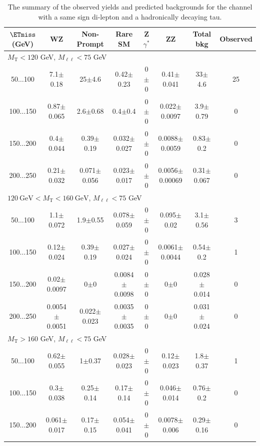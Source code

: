 \begin{landscape}
\begin{table}
\end{table}
\begin{table}
\small
\begin{center}
\caption{\label{tab:SStau1} The summary of the observed yields and predicted backgrounds for the channel with a same sign di-lepton and a hadronically decaying tau. }
\begin{tabular}{| c | c c c c c c c | }\hline\hline
$\ETmiss$ (GeV) & WZ & Non-Prompt & Rare SM & Z$\gamma^*$ & ZZ & Total bkg & Observed\\\hline\hline
\multicolumn{7}{l}{$M_{\text{T}} < 120$ GeV, $M_{\ell\ell} < 75$ GeV}\\\hline\hline
50$\dots$100&7.1$\pm$0.18&25$\pm$4.6&0.42$\pm$0.23&0$\pm$0&0.41$\pm$0.041&33$\pm$4.6&25\\
100$\dots$150&0.87$\pm$0.065&2.6$\pm$0.68&0.4$\pm$0.4&0$\pm$0&0.022$\pm$0.0097&3.9$\pm$0.79&0\\
150$\dots$200&0.4$\pm$0.044&0.39$\pm$0.19&0.032$\pm$0.027&0$\pm$0&0.0088$\pm$0.0059&0.83$\pm$0.2&0\\
200$\dots$250&0.21$\pm$0.032&0.071$\pm$0.056&0.023$\pm$0.017&0$\pm$0&0.0056$\pm$0.00069&0.31$\pm$0.067&0\\
\hline\hline
\multicolumn{7}{l}{$120~\mathrm{GeV} < M_{\text{T}} < 160~\mathrm{GeV}$, $M_{\ell\ell} < 75$ GeV}\\\hline\hline
50$\dots$100&1.1$\pm$0.072&1.9$\pm$0.55&0.078$\pm$0.059&0$\pm$0&0.095$\pm$0.02&3.1$\pm$0.56&3\\
100$\dots$150&0.12$\pm$0.024&0.39$\pm$0.19&0.027$\pm$0.024&0$\pm$0&0.0061$\pm$0.0044&0.54$\pm$0.2&1\\
150$\dots$200&0.02$\pm$0.0097&0$\pm$0&0.0084$\pm$0.0098&0$\pm$0&0$\pm$0&0.028$\pm$0.014&0\\
200$\dots$250&0.0054$\pm$0.0051&0.022$\pm$0.023&0.0035$\pm$0.0035&0$\pm$0&0$\pm$0&0.031$\pm$0.024&0\\
\hline\hline
\multicolumn{7}{l}{$M_{\text{T}} > 160$ GeV, $M_{\ell\ell} < 75$ GeV}\\\hline\hline
50$\dots$100&0.62$\pm$0.055&1$\pm$0.37&0.028$\pm$0.023&0$\pm$0&0.12$\pm$0.023&1.8$\pm$0.37&1\\
100$\dots$150&0.3$\pm$0.038&0.25$\pm$0.14&0.17$\pm$0.14&0$\pm$0&0.046$\pm$0.014&0.76$\pm$0.2&0\\
150$\dots$200&0.061$\pm$0.017&0.17$\pm$0.15&0.054$\pm$0.041&0$\pm$0&0.0078$\pm$0.006&0.29$\pm$0.16&0\\

\end{tabular}
\end{center}
\end{table}
\end{landscape}
